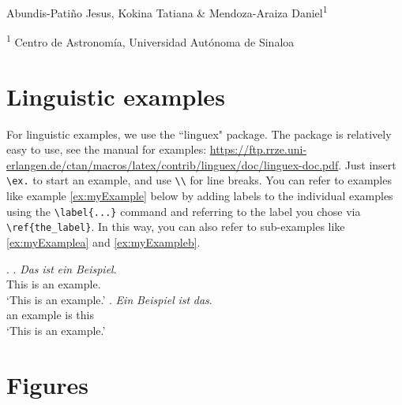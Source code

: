 \vspace{30pt}
\begin{center}
    \LARGE{}
\end{center}

\begin{center}
\vspace{4pt}
\large
    Abundis-Patiño Jesus, Kokina Tatiana \& Mendoza-Araiza Daniel\textsuperscript{1}
    
\small
   \textsuperscript{1} Centro de Astronomía, Universidad Autónoma de Sinaloa

\end{center}






\vspace{10pt}



\section{Linguistic examples} \label{sec:linguex}

For linguistic examples, we use the ``linguex" package. The package is relatively easy to use, see the manual for examples: \url{https://ftp.rrze.uni-erlangen.de/ctan/macros/latex/contrib/linguex/doc/linguex-doc.pdf}. Just insert \verb!\ex.! to start an example, and use \verb!\\! for line breaks. You can refer to examples like example \ref{ex:myExample} below by adding labels to the individual examples using the \verb!\label{...}! command and referring to the label you chose via \verb!\ref{the_label}!. In this way, you can also refer to sub-examples like \ref{ex:myExamplea} and \ref{ex:myExampleb}.
 
\ex. \label{ex:myExample}
 \ag. \textit{Das} \textit{ist} \textit{ein} \textit{Beispiel}. \\
  This is an example. \\
  `This is an example.' \label{ex:myExamplea}
  \bg. \textit{Ein} \textit{Beispiel} \textit{ist} \textit{das}. \\
  an example is this \\
  `This is an example.' \label{ex:myExampleb}


\section{Figures}

